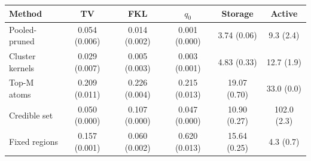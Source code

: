 \begin{tabular}{lccccc}
\toprule
Method & TV & FKL & $q_0$ & Storage & Active \\
\midrule
Pooled-pruned & 0.054 (0.006) & 0.014 (0.002) & 0.001 (0.000) & 3.74 (0.06) & 9.3 (2.4) \\
Cluster kernels & 0.029 (0.007) & 0.005 (0.003) & 0.003 (0.001) & 4.83 (0.33) & 12.7 (1.9) \\
Top-M atoms & 0.209 (0.011) & 0.226 (0.004) & 0.215 (0.013) & 19.07 (0.70) & 33.0 (0.0) \\
Credible set & 0.050 (0.000) & 0.107 (0.000) & 0.047 (0.000) & 10.90 (0.27) & 102.0 (2.3) \\
Fixed regions & 0.157 (0.001) & 0.060 (0.002) & 0.620 (0.013) & 15.64 (0.25) & 4.3 (0.7) \\
\bottomrule
\end{tabular}
